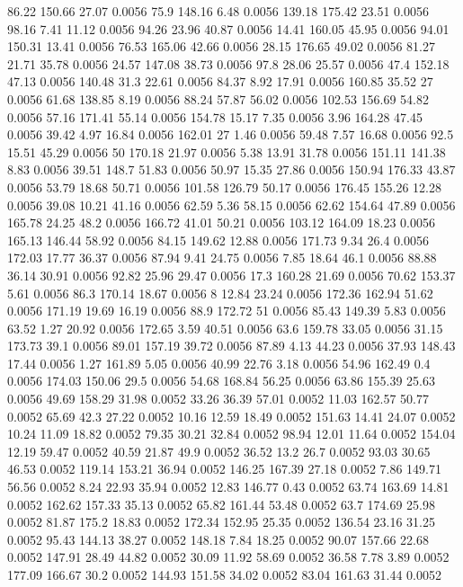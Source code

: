 86.22	150.66	27.07	0.0056
75.9	148.16	6.48	0.0056
139.18	175.42	23.51	0.0056
98.16	7.41	11.12	0.0056
94.26	23.96	40.87	0.0056
14.41	160.05	45.95	0.0056
94.01	150.31	13.41	0.0056
76.53	165.06	42.66	0.0056
28.15	176.65	49.02	0.0056
81.27	21.71	35.78	0.0056
24.57	147.08	38.73	0.0056
97.8	28.06	25.57	0.0056
47.4	152.18	47.13	0.0056
140.48	31.3	22.61	0.0056
84.37	8.92	17.91	0.0056
160.85	35.52	27	0.0056
61.68	138.85	8.19	0.0056
88.24	57.87	56.02	0.0056
102.53	156.69	54.82	0.0056
57.16	171.41	55.14	0.0056
154.78	15.17	7.35	0.0056
3.96	164.28	47.45	0.0056
39.42	4.97	16.84	0.0056
162.01	27	1.46	0.0056
59.48	7.57	16.68	0.0056
92.5	15.51	45.29	0.0056
50	170.18	21.97	0.0056
5.38	13.91	31.78	0.0056
151.11	141.38	8.83	0.0056
39.51	148.7	51.83	0.0056
50.97	15.35	27.86	0.0056
150.94	176.33	43.87	0.0056
53.79	18.68	50.71	0.0056
101.58	126.79	50.17	0.0056
176.45	155.26	12.28	0.0056
39.08	10.21	41.16	0.0056
62.59	5.36	58.15	0.0056
62.62	154.64	47.89	0.0056
165.78	24.25	48.2	0.0056
166.72	41.01	50.21	0.0056
103.12	164.09	18.23	0.0056
165.13	146.44	58.92	0.0056
84.15	149.62	12.88	0.0056
171.73	9.34	26.4	0.0056
172.03	17.77	36.37	0.0056
87.94	9.41	24.75	0.0056
7.85	18.64	46.1	0.0056
88.88	36.14	30.91	0.0056
92.82	25.96	29.47	0.0056
17.3	160.28	21.69	0.0056
70.62	153.37	5.61	0.0056
86.3	170.14	18.67	0.0056
8	12.84	23.24	0.0056
172.36	162.94	51.62	0.0056
171.19	19.69	16.19	0.0056
88.9	172.72	51	0.0056
85.43	149.39	5.83	0.0056
63.52	1.27	20.92	0.0056
172.65	3.59	40.51	0.0056
63.6	159.78	33.05	0.0056
31.15	173.73	39.1	0.0056
89.01	157.19	39.72	0.0056
87.89	4.13	44.23	0.0056
37.93	148.43	17.44	0.0056
1.27	161.89	5.05	0.0056
40.99	22.76	3.18	0.0056
54.96	162.49	0.4	0.0056
174.03	150.06	29.5	0.0056
54.68	168.84	56.25	0.0056
63.86	155.39	25.63	0.0056
49.69	158.29	31.98	0.0052
33.26	36.39	57.01	0.0052
11.03	162.57	50.77	0.0052
65.69	42.3	27.22	0.0052
10.16	12.59	18.49	0.0052
151.63	14.41	24.07	0.0052
10.24	11.09	18.82	0.0052
79.35	30.21	32.84	0.0052
98.94	12.01	11.64	0.0052
154.04	12.19	59.47	0.0052
40.59	21.87	49.9	0.0052
36.52	13.2	26.7	0.0052
93.03	30.65	46.53	0.0052
119.14	153.21	36.94	0.0052
146.25	167.39	27.18	0.0052
7.86	149.71	56.56	0.0052
8.24	22.93	35.94	0.0052
12.83	146.77	0.43	0.0052
63.74	163.69	14.81	0.0052
162.62	157.33	35.13	0.0052
65.82	161.44	53.48	0.0052
63.7	174.69	25.98	0.0052
81.87	175.2	18.83	0.0052
172.34	152.95	25.35	0.0052
136.54	23.16	31.25	0.0052
95.43	144.13	38.27	0.0052
148.18	7.84	18.25	0.0052
90.07	157.66	22.68	0.0052
147.91	28.49	44.82	0.0052
30.09	11.92	58.69	0.0052
36.58	7.78	3.89	0.0052
177.09	166.67	30.2	0.0052
144.93	151.58	34.02	0.0052
83.04	161.63	31.44	0.0052

